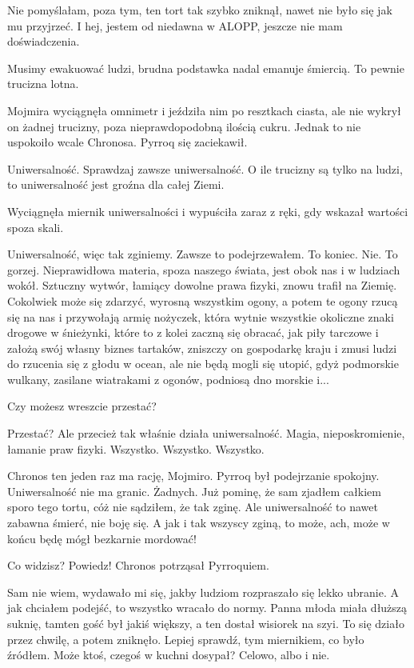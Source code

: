 \ds{} Nie pomyślałam, poza tym, ten tort tak szybko zniknął, nawet nie było się jak mu przyjrzeć. 
I hej, jestem od niedawna w ALOPP, jeszcze nie mam doświadczenia. \de{}

\ds{} Musimy ewakuować ludzi, brudna podstawka nadal emanuje śmiercią. To pewnie trucizna lotna. \de{}

Mojmira wyciągnęła omnimetr i jeździła nim po resztkach ciasta, ale nie wykrył on żadnej trucizny, poza nieprawdopodobną ilością cukru.
Jednak to nie uspokoiło wcale Chronosa. Pyrroq się zaciekawił.

\ds{} Uniwersalność. Sprawdzaj zawsze uniwersalność. O ile trucizny są tylko na ludzi, to uniwersalność jest groźna dla całej Ziemi. \de{}

Wyciągnęła miernik uniwersalności i wypuściła zaraz z ręki, gdy wskazał wartości spoza skali.

\ds{} Uniwersalność, więc tak zginiemy. Zawsze to podejrzewałem. To koniec. Nie. To gorzej. Nieprawidłowa materia, spoza naszego świata, jest obok nas i w ludziach wokół.
Sztuczny wytwór, łamiący dowolne prawa fizyki, znowu trafił na Ziemię.
Cokolwiek może się zdarzyć, wyrosną wszystkim ogony, a potem te ogony rzucą się na nas i przywołają armię nożyczek, która wytnie wszystkie okoliczne znaki drogowe w śnieżynki, które to
z kolei zaczną się obracać, jak piły tarczowe i założą swój własny biznes tartaków, zniszczy on gospodarkę kraju i zmusi ludzi do rzucenia się z głodu w ocean, ale nie będą mogli się
utopić, gdyż podmorskie wulkany, zasilane wiatrakami z ogonów, podniosą dno morskie i... \de{}

\ds{} Czy możesz wreszcie przestać? \de{}

\ds{} Przestać? Ale przecież tak właśnie działa uniwersalność. Magia, nieposkromienie, łamanie praw fizyki. Wszystko. Wszystko. Wszystko. \de{}

\ds{} Chronos ten jeden raz ma rację, Mojmiro. \dm{} Pyrroq był podejrzanie spokojny. \dm{} Uniwersalność nie ma granic. Żadnych. 
Już pominę, że sam zjadłem całkiem sporo tego tortu, cóż nie sądziłem, że tak zginę. Ale uniwersalność to nawet zabawna śmierć, nie boję się. 
A jak i tak wszyscy zginą, to może, ach, może w końcu będę mógł bezkarnie mordować! \de{}

\ds{} Co widzisz? Powiedz! \dm{} Chronos potrząsał Pyrroquiem. \de{}

\ds{} Sam nie wiem, wydawało mi się, jakby ludziom rozpraszało się lekko ubranie. A jak chciałem podejść, to wszystko wracało do normy.
Panna młoda miała dłuższą suknię, tamten gość był jakiś większy, a ten dostał wisiorek na szyi. To się działo przez chwilę, a potem zniknęło.
Lepiej sprawdź, tym miernikiem, co było źródłem. Może ktoś, czegoś w kuchni dosypał? Celowo, albo i nie. \de{}

